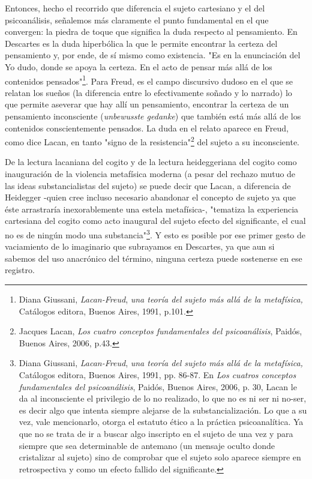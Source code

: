 \documentclass{book}
\begin{document}
Entonces, hecho el recorrido que diferencia el sujeto cartesiano y el
del psicoanálisis, señalemos más claramente el punto fundamental en el
que convergen: la piedra de toque que significa la duda respecto al
pensamiento. En Descartes es la duda hiperbólica la que le permite
encontrar la certeza del pensamiento y, por ende, de sí mismo como
existencia. "Es en la enunciación del Yo dudo, donde se apoya la
certeza. En el acto de pensar más allá de los contenidos
pensados"\footnote{Diana Giussani, \emph{Lacan-Freud}, \emph{una teoría
  del sujeto más allá de la metafísica,} Catálogos editora, Buenos
  Aires, 1991, p.101.}. Para Freud, es el campo discursivo dudoso en el
que se relatan los sueños (la diferencia entre lo efectivamente soñado y
lo narrado) lo que permite aseverar que hay allí un pensamiento,
encontrar la certeza de un pensamiento inconsciente (\emph{unbewusste
gedanke}) que también está más allá de los contenidos conscientemente
pensados. La duda en el relato aparece en Freud, como dice Lacan, en
tanto "signo de la resistencia"\footnote{Jacques Lacan, \emph{Los cuatro
  conceptos fundamentales del psicoanálisis}, Paidós, Buenos Aires,
  2006, p.43.} del sujeto a su inconsciente.

De la lectura lacaniana del cogito y de la lectura heideggeriana del
cogito como inauguración de la violencia metafísica moderna (a pesar del
rechazo mutuo de las ideas substancialistas del sujeto) se puede decir
que Lacan, a diferencia de Heidegger -quien cree incluso necesario
abandonar el concepto de sujeto ya que éste arrastraría inexorablemente
una estela metafísica-, "tematiza la experiencia cartesiana del cogito
como acto inaugural del sujeto efecto del significante, el cual no es de
ningún modo una substancia"\footnote{Diana Giussani, \emph{Lacan-Freud},
  \emph{una teoría del sujeto más allá de la metafísica,} Catálogos
  editora, Buenos Aires, 1991, pp. 86-87. En \emph{Los cuatros conceptos
  fundamentales del psicoanálisis}, Paidós, Buenos Aires, 2006, p. 30,
  Lacan le da al inconsciente el privilegio de lo no realizado, lo que
  no es ni ser ni no-ser, es decir algo que intenta siempre alejarse de
  la substancialización. Lo que a su vez, vale mencionarlo, otorga el
  estatuto ético a la práctica psicoanalítica. Ya que no se trata de ir
  a buscar algo inscripto en el sujeto de una vez y para siempre que sea
  determinable de antemano (un mensaje oculto donde cristalizar al
  sujeto) sino de comprobar que el sujeto solo aparece siempre en
  retrospectiva y como un efecto fallido del significante.}. Y esto es
posible por ese primer gesto de vaciamiento de lo imaginario que
subrayamos en Descartes, ya que aun si sabemos del uso anacrónico del
término, ninguna certeza puede sostenerse en ese registro.
\end{document}
